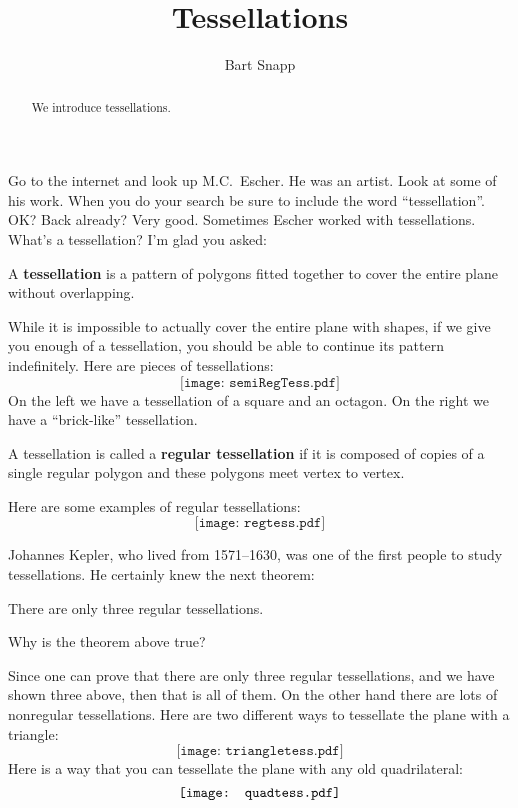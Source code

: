 \documentclass{ximera}
\title{Tessellations}
\author{Bart Snapp}
\begin{document}
\begin{abstract}
  We introduce tessellations.
\end{abstract}
\maketitle

Go to the internet and look up M.C.\ Escher. He
was an artist. Look at some of his work. When you do your search be
sure to include the word ``tessellation''. OK? Back already? Very
good. Sometimes Escher worked with tessellations. What's a
tessellation? I'm glad you asked:

\begin{definition} A \textbf{tessellation} is a pattern of 
polygons fitted together to cover the entire plane without
overlapping.  
\end{definition}
While it is impossible to actually cover the entire plane with shapes,
if we give you enough of a tessellation, you should be able to continue
its pattern indefinitely.  Here are pieces of tessellations:
\[
\texttt{[image: semiRegTess.pdf]}
\]
On the left we have a tessellation of a square and an octagon. On the
right we have a ``brick-like'' tessellation.

\begin{definition}
A tessellation is called a \textbf{regular tessellation} if it is
composed of copies of a single regular polygon and these polygons meet
vertex to vertex.
\end{definition}


\begin{example} Here are some examples of regular tessellations:
\[
\texttt{[image: regtess.pdf]}
\]
\end{example}

Johannes Kepler, who lived from 1571--1630,
was one of the first people to study tessellations. He certainly knew
the next theorem:

\begin{theorem} There are only three regular tessellations.
\end{theorem}

\begin{question} Why is the theorem above true?
\end{question}


Since one can prove that there are only three regular tessellations,
and we have shown three above, then that is all of them. On the other
hand there are lots of nonregular tessellations. Here are two
different ways to tessellate the plane with a
triangle:
\[
\texttt{[image: triangletess.pdf]}
\]
Here is a way that you can tessellate the plane with any old
quadrilateral:
\[\index{tessellation!any quadrilateral}\index{quadrilateral!tessellation of}
\texttt{[image: quadtess.pdf]}
\]
\end{document}
